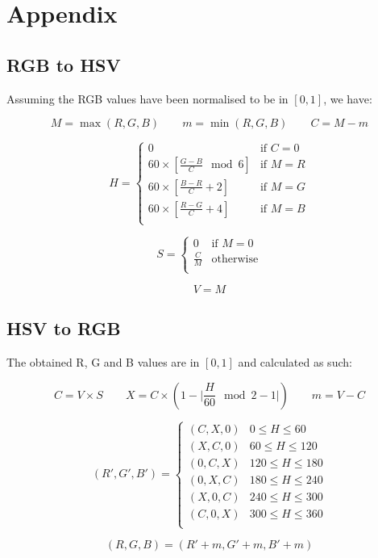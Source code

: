 %
%
\appendix

\chapter{Appendix}

\section{RGB to HSV}

Assuming the RGB values have been normalised to be in $[0, 1]$, we have:

\begin{equation*}
    M = \max (R, G, B)
    \qquad
    m = \min (R, G, B)
    \qquad
    C = M - m
\end{equation*}

$$
H =
\begin{cases}
0 & \text{if $C = 0$}\\
60 \times \left[ \frac{G - B}{C} \mod 6\right] & \text{if $M = R$} \\
60 \times \left[ \frac{B - R}{C} + 2\right] & \text{if $M = G$} \\
60 \times \left[ \frac{R - G}{C} + 4\right] & \text{if $M = B$} \\
\end{cases}
$$

$$
S =
\begin{cases}
0 & \text{if $M = 0$}\\
\frac{C}{M}& \text{otherwise} \\
\end{cases}
$$

$$V = M$$

\section{HSV to RGB}

The obtained R, G and B values are in $[0, 1]$ and calculated as such:

\begin{equation*}
    C = V \times S
    \qquad
    X = C \times (1 - \lvert \frac{H}{60} \mod 2 - 1\rvert )
    \qquad
    m = V - C
\end{equation*}

$$
(R', G', B') = 
\begin{cases}
(C, X, 0) & 0 \leq H \leq 60 \\
(X, C, 0) & 60 \leq H \leq 120 \\
(0, C, X) & 120 \leq H \leq 180 \\
(0, X, C) & 180 \leq H \leq 240 \\
(X, 0, C) & 240 \leq H \leq 300 \\
(C, 0, X) & 300 \leq H \leq 360 \\
\end{cases}
$$

$$ (R, G, B) = (R' + m, G' + m, B' + m)$$